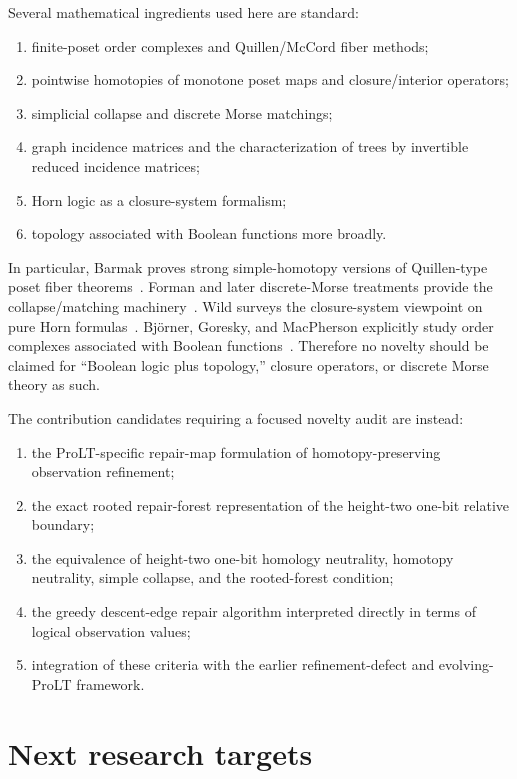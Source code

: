\documentclass[11pt]{article}
\theoremstyle{definition}
\begin{document}
Several mathematical ingredients used here are standard:
\begin{enumerate}[label=(\roman*)]
\item finite-poset order complexes and Quillen/McCord fiber methods;
\item pointwise homotopies of monotone poset maps and closure/interior operators;
\item simplicial collapse and discrete Morse matchings;
\item graph incidence matrices and the characterization of trees by invertible reduced incidence matrices;
\item Horn logic as a closure-system formalism;
\item topology associated with Boolean functions more broadly.
\end{enumerate}

In particular, Barmak proves strong simple-homotopy versions of Quillen-type poset fiber theorems~\cite{Barmak2011A}. Forman and later discrete-Morse treatments provide the collapse/matching machinery~\cite{Forman1998,Kozlov2008}. Wild surveys the closure-system viewpoint on pure Horn formulas~\cite{Wild2017}. Bj\"orner, Goresky, and MacPherson explicitly study order complexes associated with Boolean functions~\cite{BjornerGoreskyMacPherson2024}. Therefore no novelty should be claimed for ``Boolean logic plus topology,'' closure operators, or discrete Morse theory as such.

The contribution candidates requiring a focused novelty audit are instead:
\begin{enumerate}[label=(\alph*)]
\item the ProLT-specific repair-map formulation of homotopy-preserving observation refinement;
\item the exact rooted repair-forest representation of the height-two one-bit relative boundary;
\item the equivalence of height-two one-bit homology neutrality, homotopy neutrality, simple collapse, and the rooted-forest condition;
\item the greedy descent-edge repair algorithm interpreted directly in terms of logical observation values;
\item integration of these criteria with the earlier refinement-defect and evolving-ProLT framework.
\end{enumerate}

\section{Next research targets}
\end{document}
